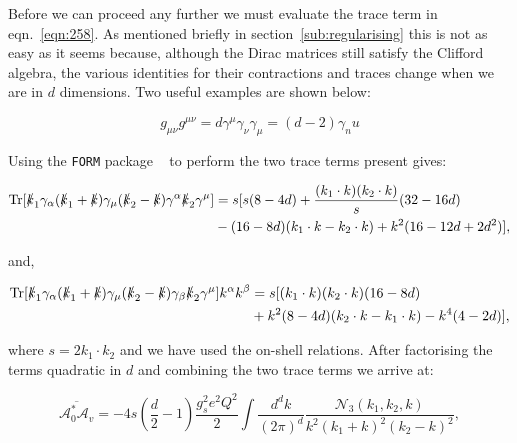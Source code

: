 		Before we can proceed any further we must evaluate the trace term in eqn.~\eqref{eqn:258}.  As mentioned briefly in
		section~\ref{sub:regularising} this is not as easy as it seems because, although the Dirac matrices still satisfy the Clifford
		algebra, the various identities for their contractions and traces change when we are in $d$ dimensions.  Two useful
		examples are shown below:

		\begin{subequations}
			\begin{equation}
			g_{\mu\nu}g^{\mu\nu} = d
			\end{equation}
			\begin{equation}
			\gamma^\mu\gamma_\nu\gamma_\mu = (d-2)\gamma_nu
			\end{equation}
		\end{subequations}

		Using the \texttt{FORM} package ~\cite{form} to perform the two trace terms present gives:

		\begin{align}
		\begin{split}
			\operatorname{Tr}[\slashed k_1 \gamma_\alpha(\slashed k_1 + \slashed k)\gamma_\mu(\slashed k_2 -
			\slashed k)\gamma^\alpha\slashed k_2\gamma^\mu] &= s[s(8-4d) + \frac{(k_1\cdot k)(k_2\cdot k)}{s}(32-16d) \\
			&- (16-8d)(k_1\cdot k - k_2\cdot k) + k^2(16-12d+2d^2)],
		\end{split}
		\end{align}

		and,

		\begin{align}
		\begin{split}
			\operatorname{Tr}[\slashed k_1 \gamma_\alpha(\slashed k_1 + \slashed k)\gamma_\mu(\slashed k_2 - \slashed k)\gamma_\beta
			\slashed k_2\gamma^\mu]k^\alpha k^\beta &= s[(k_1\cdot k)(k_2\cdot k)(16 - 8d) \\
			&+ k^2(8 - 4d)(k_2\cdot k - k_1\cdot k) - k^4(4 - 2d)],
		\end{split}
		\end{align}

		where $s = 2k_1\cdot k_2$ and we have used the on-shell relations.  After factorising the terms
		quadratic in $d$ and combining the two trace terms we arrive at:

		\begin{equation}
			\overline{\mathcal{A}_0^*\mathcal{A}_v} = -4s\left(\frac{d}{2}-1\right)\frac{g_s^2e^2Q^2}{2}
			\int\frac{d^{d}k}{(2\pi)^{d}}\frac{\mathcal{N}_3(k_1, k_2, k)}{k^2(k_1+k)^2(k_2-k)^2},
		\end{equation}

